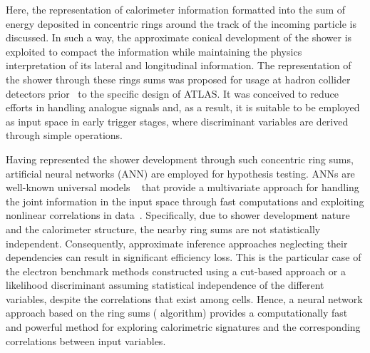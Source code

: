 Here, the representation of calorimeter information formatted into the sum of energy deposited in concentric rings around the track of the incoming particle is discussed. In such a way, the approximate conical development of the shower is exploited to compact the information while maintaining the physics interpretation of its lateral and longitudinal information. The representation of the shower through these rings sums was proposed for usage at hadron collider detectors prior~\cite{1992_spacal_rings} to the specific design of ATLAS.
It was conceived to reduce efforts in handling analogue signals and, as a result, it is suitable to be employed as input space in early trigger stages, where discriminant variables are derived through simple operations.


Having represented the shower development through such concentric ring sums,  artificial neural networks (ANN) are employed for hypothesis testing.  ANNs are well-known universal models ~\cite{haykin_2008} that provide a multivariate approach for handling the joint information in the input space through fast computations and exploiting nonlinear correlations in data~\cite{Duda}. Specifically, due to shower development nature and the calorimeter structure, the nearby ring sums are not statistically independent. Consequently, approximate inference approaches neglecting their dependencies can result in significant efficiency loss. This is the particular case of the electron benchmark methods constructed using a cut-based approach or a likelihood discriminant assuming statistical independence of the different variables, despite the correlations that exist among cells.  Hence, a neural network approach based on the ring sums (\rnn{} algorithm) provides a computationally fast and powerful method for exploring calorimetric signatures and the corresponding correlations between input variables. 



